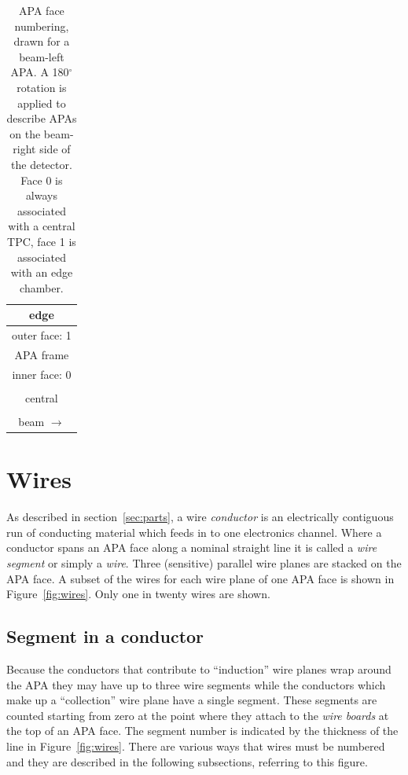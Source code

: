 \documentclass[pdftex,12pt,letter]{article}
\begin{document}
\begin{table}[htp]
  \label{tab:faces}
  \centering
  \begin{tabular}[h]{|c|}
    \hline
    edge\\
    \hline
    \hline
    outer face: 1\\
    \hline
    APA frame\\
    \hline
    inner face: 0 \\
    \hline
    \hline
    \\
    central \\
    \\
    \hline
    \multicolumn{1}{c}{beam $\longrightarrow$} \\

  \end{tabular}
  \caption{APA face numbering, drawn for a beam-left APA.  A
    180$^\circ$ rotation is applied to describe APAs on the beam-right
    side of the detector.  Face 0 is always associated with a central TPC, face 1 is associated with an edge chamber.}
\end{table}


\section{Wires}

As described in section~\ref{sec:parts}, a wire \textit{conductor} is
an electrically contiguous run of conducting material which feeds in
to one electronics channel.  Where a conductor spans an APA face along
a nominal straight line it is called a \textit{wire segment} or simply
a \textit{wire}.  Three (sensitive) parallel wire planes are stacked
on the APA face.  A subset of the wires for each wire plane of one
APA face is shown in Figure~\ref{fig:wires}.  Only one in twenty wires
are shown.

\subsection{Segment in a conductor}

Because the conductors that contribute to ``induction'' wire planes
wrap around the APA they may have up to three wire segments while the
conductors which make up a ``collection'' wire plane have a single
segment.  These segments are counted starting from zero at the point
where they attach to the \textit{wire boards} at the top of an APA
face.  The segment number is indicated by the thickness of the line in
Figure~\ref{fig:wires}.  There are various ways that wires must be
numbered and they are described in the following subsections,
referring to this figure.
\end{document}
